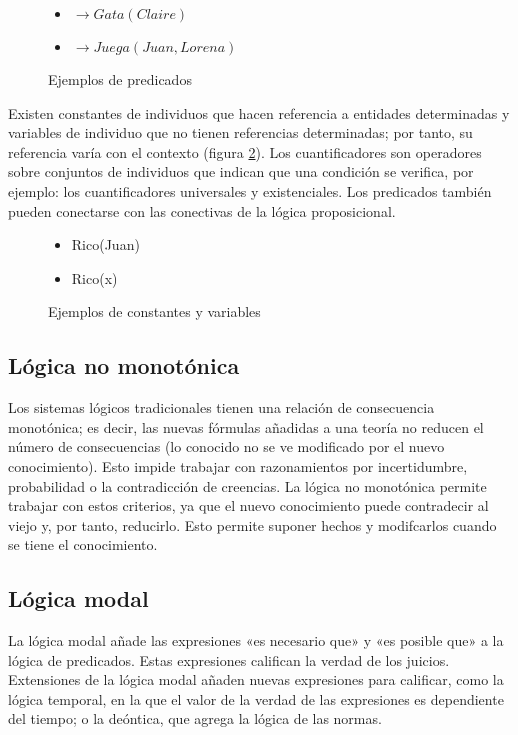 \documentclass[11pt,captions=nooneline,DIV=14, parskip=full]{scrartcl}
\begin{document}
\begin{figure}[h]
\label{fig:predicados}
\begin{itemize}
\item {} $ \to Gata(Claire) $
\item {} $ \to Juega(Juan,Lorena) $
\end{itemize}
\caption{Ejemplos de predicados}
\end{figure}

Existen constantes de individuos que hacen referencia a entidades determinadas y variables de individuo que no tienen referencias determinadas; por tanto, su referencia varía con el contexto (figura \ref{fig:constantes}). Los cuantificadores son operadores sobre conjuntos de individuos que indican que una condición se verifica, por ejemplo: los cuantificadores universales y existenciales. Los predicados también pueden conectarse con las conectivas de la lógica proposicional.

\begin{figure}[h]
\label{fig:constantes}
\begin{itemize}
\item Rico(Juan)
\item Rico(x)
\end{itemize}
\caption{Ejemplos de constantes y variables}
\end{figure}

\subsection{Lógica no monotónica}

Los sistemas lógicos tradicionales tienen una relación de consecuencia monotónica; es decir, las nuevas fórmulas añadidas a una teoría no reducen el número de consecuencias (lo conocido no se ve modificado por el nuevo conocimiento). Esto impide trabajar con razonamientos por incertidumbre, probabilidad o la contradicción de creencias. La lógica no monotónica permite trabajar con estos criterios, ya que el nuevo conocimiento puede contradecir al viejo y, por tanto, reducirlo. Esto permite suponer hechos y modifcarlos cuando se tiene el conocimiento.

\subsection{Lógica modal}

La lógica modal añade las expresiones «es necesario que» y «es posible que» a la lógica de predicados. Estas expresiones califican la verdad de los juicios. Extensiones de la lógica modal añaden nuevas expresiones para calificar, como la lógica temporal, en la que el valor de la verdad de las expresiones es dependiente del tiempo; o la deóntica, que agrega la lógica de las normas.
\end{document}
